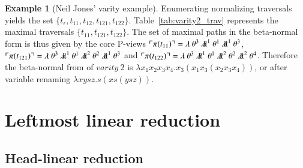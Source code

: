 \documentclass{elsarticle}
\theoremstyle{plain}
\theoremstyle{definition}
\newtheorem{example}{Example}[section]
\theoremstyle{remark}
\newcommand{\ghostlmd}{{\lambda\!\!\lambda}}
\newcommand{\ghostvar}{\theta}
\def\coresymbol{\pi} %
\newcommand{\core}[1]{\coresymbol(#1)} %
\begin{document}
\begin{example}[Neil Jones' varity example]
Enumerating normalizing traversals yields the set $\{t_\epsilon, t_{11}, t_{12}, t_{121}, t_{122} \}$. Table~\ref{tab:varity2_trav} represents the maximal traversals $\{ t_{11}, t_{121}, t_{122} \}$. The set of maximal paths in the beta-normal form is thus given by the core P-views
$\pview{\core{t_{11}}} =
        \lambda \ \ghostvar^{3}\ \ghostlmd^{1}\
        \ghostvar^{1}\ \ghostlmd^{1}\ \ghostvar^{3}
$,
$\pview{\core{t_{121}}} =
        \lambda \ \ghostvar^{3}\ \ghostlmd^{1}\ \ghostvar^{1}\ \ghostlmd^{2}\ \ghostvar^{2}\ \ghostlmd^{1}\ \ghostvar^{3}$
and
$\pview{\core{t_{122}}} =
    \lambda \ \ghostvar^{3}\ \ghostlmd^{1}\ \ghostvar^{1}\ \ghostlmd^{2}\ \ghostvar^{2}\ \ghostlmd^{2}\ \ghostvar^{4}$.
Therefore the beta-normal from of $varity\ 2$ is
$\lambda x_1 x_2 x_3 x_4 . x_3 (x_1 x_3 (x_2 x_3 x_4))$,
or after variable renaming $\lambda x y s z . s (x s (y s z))$.
\end{example}


\section{Leftmost linear reduction}
\label{sec:leftmostlinearred}


\subsection{Head-linear reduction}
\end{document}
